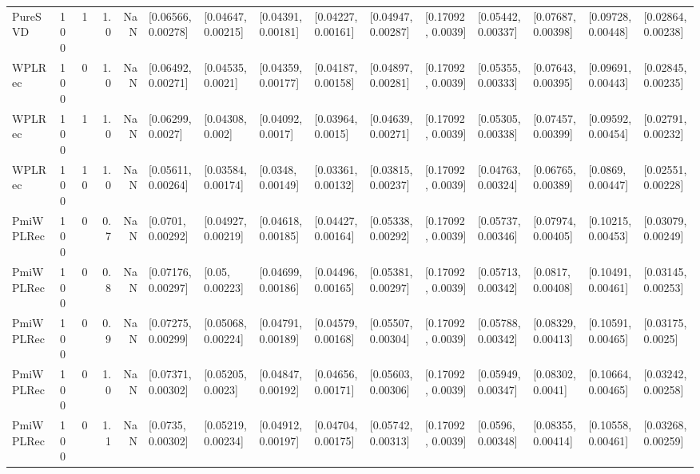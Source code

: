 \begin{tabular}{lllrrllllllllll}
   PureSVD &  100 &     1 &   1.0 &   NaN &  [0.06566, 0.00278] &  [0.04647, 0.00215] &  [0.04391, 0.00181] &  [0.04227, 0.00161] &  [0.04947, 0.00287] &  [0.17092, 0.0039] &  [0.05442, 0.00337] &  [0.07687, 0.00398] &  [0.09728, 0.00448] &  [0.02864, 0.00238] \\
    WPLRec &  100 &     0 &   1.0 &   NaN &  [0.06492, 0.00271] &   [0.04535, 0.0021] &  [0.04359, 0.00177] &  [0.04187, 0.00158] &  [0.04897, 0.00281] &  [0.17092, 0.0039] &  [0.05355, 0.00333] &  [0.07643, 0.00395] &  [0.09691, 0.00443] &  [0.02845, 0.00235] \\
    WPLRec &  100 &     1 &   1.0 &   NaN &   [0.06299, 0.0027] &    [0.04308, 0.002] &   [0.04092, 0.0017] &   [0.03964, 0.0015] &  [0.04639, 0.00271] &  [0.17092, 0.0039] &  [0.05305, 0.00338] &  [0.07457, 0.00399] &  [0.09592, 0.00454] &  [0.02791, 0.00232] \\
    WPLRec &  100 &    10 &   1.0 &   NaN &  [0.05611, 0.00264] &  [0.03584, 0.00174] &   [0.0348, 0.00149] &  [0.03361, 0.00132] &  [0.03815, 0.00237] &  [0.17092, 0.0039] &  [0.04763, 0.00324] &  [0.06765, 0.00389] &   [0.0869, 0.00447] &  [0.02551, 0.00228] \\
 PmiWPLRec &  100 &     0 &   0.7 &   NaN &   [0.0701, 0.00292] &  [0.04927, 0.00219] &  [0.04618, 0.00185] &  [0.04427, 0.00164] &  [0.05338, 0.00292] &  [0.17092, 0.0039] &  [0.05737, 0.00346] &  [0.07974, 0.00405] &  [0.10215, 0.00453] &  [0.03079, 0.00249] \\
 PmiWPLRec &  100 &     0 &   0.8 &   NaN &  [0.07176, 0.00297] &     [0.05, 0.00223] &  [0.04699, 0.00186] &  [0.04496, 0.00165] &  [0.05381, 0.00297] &  [0.17092, 0.0039] &  [0.05713, 0.00342] &   [0.0817, 0.00408] &  [0.10491, 0.00461] &  [0.03145, 0.00253] \\
 PmiWPLRec &  100 &     0 &   0.9 &   NaN &  [0.07275, 0.00299] &  [0.05068, 0.00224] &  [0.04791, 0.00189] &  [0.04579, 0.00168] &  [0.05507, 0.00304] &  [0.17092, 0.0039] &  [0.05788, 0.00342] &  [0.08329, 0.00413] &  [0.10591, 0.00465] &   [0.03175, 0.0025] \\
 PmiWPLRec &  100 &     0 &   1.0 &   NaN &  [0.07371, 0.00302] &   [0.05205, 0.0023] &  [0.04847, 0.00192] &  [0.04656, 0.00171] &  [0.05603, 0.00306] &  [0.17092, 0.0039] &  [0.05949, 0.00347] &   [0.08302, 0.0041] &  [0.10664, 0.00465] &  [0.03242, 0.00258] \\
 PmiWPLRec &  100 &     0 &   1.1 &   NaN &   [0.0735, 0.00302] &  [0.05219, 0.00234] &  [0.04912, 0.00197] &  [0.04704, 0.00175] &  [0.05742, 0.00313] &  [0.17092, 0.0039] &   [0.0596, 0.00348] &  [0.08355, 0.00414] &  [0.10558, 0.00461] &  [0.03268, 0.00259] \\

\end{tabular}
